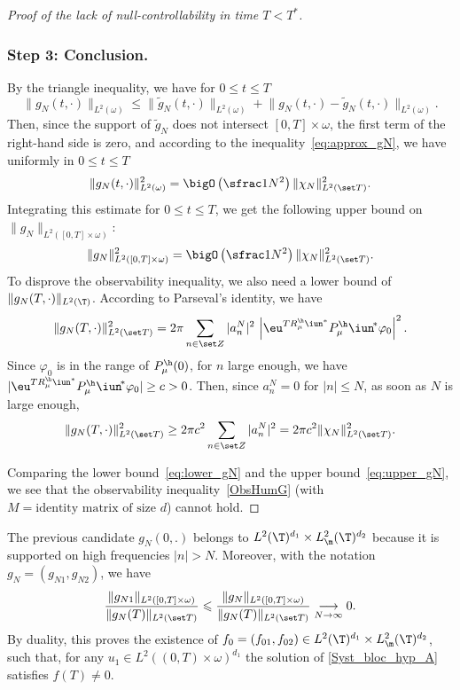 \begin{proof}[Proof of the lack of null-controllability in time $T<T^*$]
\subsubsection*{Step 3: Conclusion.}
By the triangle inequality, we have for $0\leq t\leq T$
\[
\lVert g_N(t,\cdot)\rVert_{L^2(\omega)} \leq \lVert \widetilde g_N(t,\cdot)\rVert_{L^2(\omega)}
+\lVert g_N(t,\cdot)-\widetilde g_N(t,\cdot)\rVert_{L^2(\omega)}.
\]
Then, since the support of $\widetilde g_N$ does not intersect $[0,T]\times \omega$, the first term of the right-hand side is zero, and according to the inequality~\eqref{eq:approx_gN}, we have uniformly in $0\leq t\leq T$
\[
\lVert g_N(t,\cdot)\rVert_{L^2(\omega)}^2 =
\bigO\left(\sfrac 1{N^2}\right)\lVert\chi_N\rVert_{L^2(\set T)}^2.
\]
Integrating this estimate for $0\leq t\leq T$, we get the following upper bound on $\lVert g_N\rVert_{L^2([0,T]\times\omega)}$:
\begin{equation}
\label{eq:upper_gN}
\lVert g_N\rVert_{L^2([0,T]\times \omega)}^2 =
\bigO\left(\sfrac 1{N^2}\right)\lVert\chi_N\rVert_{L^2(\set T)}^2.
\end{equation}
To disprove the observability inequality, we also need a lower bound of $\| g_N(T,\cdot) \|_{L^2(\T)}$. According to Parseval's identity, we have
\[
\lVert g_N(T,\cdot)\rVert_{L^2(\set T)}^2
= 2\pi\sum_{n\in \set Z} |a_n^N|^2\,\left| \eu^{TR_\mu^\h\iun^* } P_\mu^\h\iun^{\!*} \varphi_0\right|^2.
\]
Since $\varphi_0$ is in the range of $P_\mu^\h(0)$, for $n$ large enough, we have $|\eu^{TR_\mu^\h\iun^* } P_\mu^\h\iun^{\!*}\varphi_0| \geq c>0$. Then, since $a_n^N = 0$ for $|n|\leq N$, as soon as $N$ is large enough,
\begin{equation}
\label{eq:lower_gN}
\lVert g_N(T,\cdot)\rVert_{L^2(\set T)}^2
\geq 2\pi c^2\sum_{n\in \set Z} |a_n^N|^2 = 2\pi c^2\lVert \chi_N\rVert_{L^2(\set T)}^2.
\end{equation}

Comparing the lower bound~\eqref{eq:lower_gN} and the upper bound~\eqref{eq:upper_gN}, we see that the observability inequality~\eqref{ObsHumG} (with $M = \text{identity matrix of size } d$) cannot hold.
\end{proof}

\begin{remark} \label{Rk_moy0}
The previous candidate $g_N(0,.)$ belongs to $L^2(\T)^{d_1} \times L^2_\m(\T)^{d_2}$ because it is supported on high frequencies $|n|>N$.
Moreover, with the notation $g_N=(g_{N1},g_{N2})$, we have
$$\frac{\lVert g_{N1}\rVert_{L^2([0,T]\times \omega)}}{\lVert g_N(T)\rVert_{L^2(\set T)}}
\leqslant
\frac{\lVert g_{N}\rVert_{L^2([0,T]\times \omega)}}{\lVert g_N(T)\rVert_{L^2(\set T)}}
\underset{N \to \infty}{\longrightarrow} 0.$$
By duality, this proves the existence of
$f_0=(f_{01},f_{02})\in L^2(\T)^{d_1} \times L^2_\m(\T)^{d_2}$, such that, for any $u_1 \in L^2((0,T)\times\omega)^{d_1}$ the solution of \eqref{Syst_bloc_hyp_A} satisfies $f(T) \neq 0$.
\end{remark}

